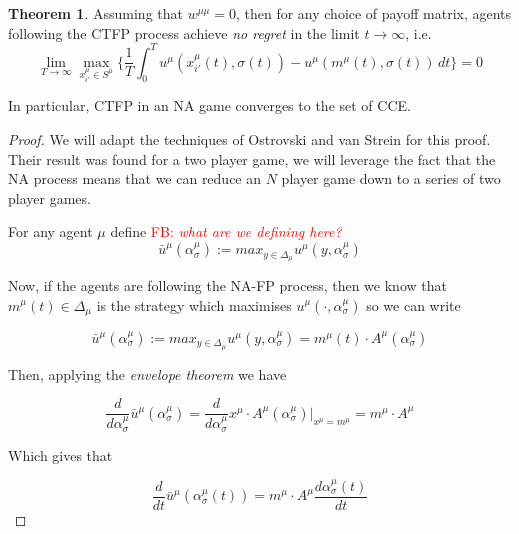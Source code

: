 \documentclass{article}
\theoremstyle{definition}
\newtheorem{theorem}{Theorem}
\newcommand{\fb}[1]{\textcolor{red}{FB: \textit{#1}}}
\begin{document}
  \begin{theorem}
    Assuming that $w^{\mu \mu} = 0$, then for any choice of payoff matrix, agents following the
    CTFP process achieve \emph{no regret} in the limit $t \rightarrow \infty$, i.e.
    \begin{equation}
      \lim_{T \rightarrow \infty} \max_{x_{i'}^\mu \in S^\mu} \Big\{ \frac{1}{T} \int_{0}^{T} u^{\mu}(x_{i'}^\mu(t), \sigma(t)) - u^{\mu}(m^\mu(t), \sigma(t)) \, dt \Big\} = 0
    \end{equation}

    In particular, CTFP in an NA game converges to the set of CCE.

  \end{theorem}
  
  \begin{proof}
    We will adapt the techniques of Ostrovski and van Strein for this proof. Their result was found for a two player game, we will leverage the fact that the NA process means that we can reduce an $N$ player game down to a series of two player games. 
     
    For any agent $\mu$ define \fb{what are we defining here?}
    \begin{equation}
      \bar{u}^\mu (\alpha_\sigma^\mu) := max_{y \in \Delta_\mu} u^\mu(y, \alpha_\sigma^\mu)
    \end{equation}

    Now, if the agents are following the NA-FP process, then we know that $m^\mu (t) \in \Delta_\mu$ is the strategy which maximises $u^\mu( \cdot, \alpha_\sigma^\mu)$ so we can write 

    \begin{equation}
      \bar{u}^\mu (\alpha_\sigma^\mu) := max_{y \in \Delta_\mu} u^\mu(y, \alpha_\sigma^\mu) = m^\mu(t) \cdot A^\mu (\alpha_\sigma^\mu)
    \end{equation}

    Then, applying the \emph{envelope theorem} \cite{} we have

    \begin{equation}
      \frac{d}{d \alpha_\sigma^\mu} \bar{u}^\mu (\alpha_\sigma^\mu) = \frac{d}{d \alpha_\sigma^\mu} x^\mu \cdot A^\mu (\alpha_\sigma^\mu) \Big |_{x^\mu = m^\mu} = m^\mu \cdot A^\mu
    \end{equation}

    Which gives that 

    \begin{equation}
      \frac{d}{dt} \bar{u}^\mu (\alpha_\sigma^\mu (t)) = m^\mu \cdot A^\mu \frac{d \alpha_\sigma^\mu (t)}{dt}
    \end{equation}


\end{proof}
\end{document}
